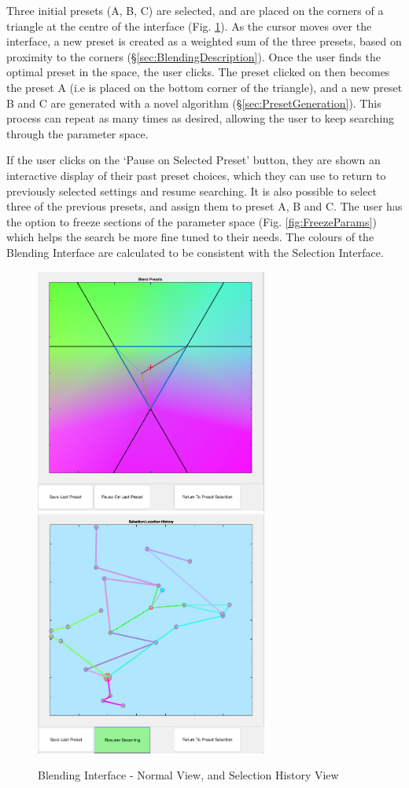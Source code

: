 \documentclass[11pt, oneside]{report}   	%
\begin{document}
Three initial presets (A, B, C) are selected, and are placed on the corners of a triangle at the centre of the interface (Fig. \ref{fig:BlendingInterface}). As the cursor moves over the interface, a new preset is created as a weighted sum of the three presets, based on proximity to the corners (\S \ref{sec:BlendingDescription}). Once the user finds the optimal preset in the space, the user clicks. The preset clicked on then becomes the preset A (i.e is placed on the bottom corner of the triangle), and a new preset B and C are generated with a novel algorithm (\S \ref{sec:PresetGeneration}). 
This process can repeat as many times as desired, allowing the user to keep searching through the parameter space.

If the user clicks on the `Pause on Selected Preset' button, they are shown an interactive display of their past preset choices, which they can use to return to previously selected settings and resume searching. It is also possible to select three of the previous presets, and assign them to preset A, B and C.
The user has the option to freeze sections of the parameter space (Fig. \ref{fig:FreezeParams}) which helps the search be more fine tuned to their needs.
The colours of the Blending Interface are calculated to be consistent with the Selection Interface.
\begin{figure}[h] 
	\centering
	\hspace*{-0.2cm}
	\includegraphics[width = 3.0in]{BlendingInterface1.png}
	\hspace*{0.2cm}
	\includegraphics[width = 3.0in]{BlendingInterface2.png}
	\caption{Blending Interface - Normal View, and Selection History View}
	\label{fig:BlendingInterface}
\end{figure}
\end{document}
